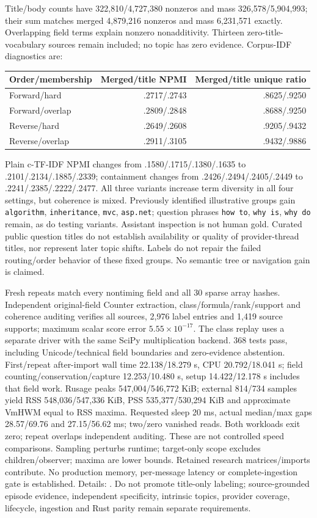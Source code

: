 \documentclass[11pt]{article}
\begin{document}
Title/body counts have 322,810/4,727,380 nonzeros and mass 326,578/5,904,993;
their sum matches merged 4,879,216 nonzeros and mass 6,231,571 exactly. Overlapping
field terms explain nonzero nonadditivity. Thirteen zero-title-vocabulary sources
remain included; no topic has zero evidence. Corpus-IDF diagnostics are:
\begin{center}\begin{tabular}{lrr}
Order/membership & Merged/title NPMI & Merged/title unique ratio\\\hline
Forward/hard & .2717/.2743 & .8625/.9250\\
Forward/overlap & .2809/.2848 & .8688/.9250\\
Reverse/hard & .2649/.2608 & .9205/.9432\\
Reverse/overlap & .2911/.3105 & .9432/.9886
\end{tabular}\end{center}
Plain c-TF-IDF NPMI changes from .1580/.1715/.1380/.1635 to
.2101/.2134/.1885/.2339; containment changes from .2426/.2494/.2405/.2449
to .2241/.2385/.2222/.2477. All three variants increase term diversity in all
four settings, but coherence is mixed. Previously identified illustrative groups
gain \texttt{algorithm}, \texttt{inheritance}, \texttt{mvc}, \texttt{asp.net};
question phrases \texttt{how to}, \texttt{why is}, \texttt{why do} remain, as do
testing variants. Assistant inspection is not human gold. Curated public question
titles do not establish availability or quality of provider-thread titles, nor
represent later topic shifts. Labels do not repair the failed routing/order
behavior of these fixed groups. No semantic tree or navigation gain is claimed.

Fresh repeats match every nontiming field and all 30 sparse array hashes.
Independent original-field Counter extraction, class/formula/rank/support and
coherence auditing verifies all sources, 2,976 label entries and 1,419 source
supports; maximum scalar score error $5.55\times10^{-17}$. The class replay uses
a separate driver with the same SciPy multiplication backend. 368 tests pass,
including Unicode/technical field boundaries and zero-evidence abstention.
First/repeat after-import wall time 22.138/18.279 s, CPU 20.792/18.041 s;
field counting/conservation/capture 12.253/10.480 s, setup 14.422/12.178 s
includes that field work. Rusage peaks 547,004/546,772 KiB; external 814/734
samples yield RSS 548,036/547,336 KiB, PSS 535,377/530,294 KiB and approximate
VmHWM equal to RSS maxima. Requested sleep 20 ms, actual median/max gaps
28.57/69.76 and 27.15/56.62 ms; two/zero vanished reads. Both workloads exit zero;
repeat overlaps independent auditing. These are not controlled speed comparisons.
Sampling perturbs runtime; target-only scope excludes children/observer; maxima
are lower bounds. Retained research matrices/imports contribute. No production
memory, per-message latency or complete-ingestion gate is established.
Details: .
Do not promote title-only labeling; source-grounded episode evidence, independent
specificity, intrinsic topics, provider coverage, lifecycle, ingestion and Rust
parity remain separate requirements.
\end{document}
